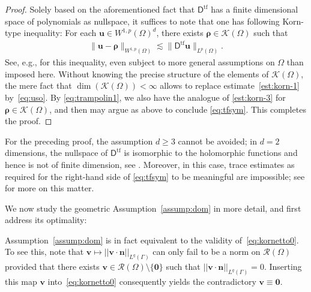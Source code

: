 \documentclass[reqno,a4paper]{amsart}
\def\norm#1{\left|\!\left| #1 \right|\!\right|}
\def\tens#1{\pmb{\mathsf{#1}}}
\def\vec#1{\boldsymbol{#1}}
\def\dim{\mathop{\mathrm{dim}}\nolimits} %
\def\b0{\vec{0}}
\def\bn{\vec{n}}
\def\bu{\vec{u}}
\def\bv{\vec{v}}
\def\brho{\vec{\rho}}
\def\BD{\tens{D}}
\begin{document}
	\begin{proof}
	Solely based on the aforementioned fact that $\BD^{\mathrm{tf}}$ has a finite dimensional space of polynomials as nullspace, it suffices to note that one has following Korn-type inequality: 
		For each $\bu\in W^{1,p}(\Omega)^{d}$, there exists $\brho\in\mathcal{K}(\Omega)$ such that 
		\begin{align}\label{eq:uso}
			\|\bu - \brho\|_{W^{1,p}(\Omega)}\lesssim \|\BD^{\mathrm{tf}}\bu\|_{L^{p}(\Omega)}. 
		\end{align}
  See, e.g., \cite{Resetnjak1,DieningGmeineder2024} for this inequality, even subject to more general assumptions on $\Omega$ than imposed here. Without knowing the precise structure of the elements of $\mathcal{K}(\Omega)$, the mere fact that $\dim(\mathcal{K}(\Omega))<\infty$ allows to replace estimate~\eqref{est:korn-1} by~\eqref{eq:uso}. By \eqref{eq:trampolin1}, we also have the analogue of \eqref{est:korn-3} for $\brho\in\mathcal{K}(\Omega)$,  and then may argue as above to conclude \eqref{eq:tfsym}. 
		This completes the proof. 
	\end{proof}
 For the preceding proof, the assumption $d\geq 3$ cannot be avoided; in $d=2$ dimensions, the nullspace of $\BD^{\mathrm{tf}}$ is isomorphic to the holomorphic functions and hence is not of finite dimension, see \cite{Resetnjak1}. Moreover, in this case, trace estimates as required for the right-hand side of \eqref{eq:tfsym} to be meaningful are impossible; see \cite{BDG.2020,DieningGmeineder2024} for more on this matter.   

 \medskip
	
	We now study the geometric Assumption~\ref{assump:dom} in more detail, and first address its optimality: 
	
	\begin{remark}  
		Assumption~\ref{assump:dom} is in fact equivalent to the validity of~\eqref{eq:kornetto0}. 
		To see this, note that $\bv\mapsto \norm{\bv\cdot\bn}_{L^{q}(\Gamma)}$ can only fail to be a norm on $\mathcal{R}(\Omega)$ provided that there exists $\bv\in\mathcal{R}(\Omega)\setminus\{\b0\}$ such that $\norm{\bv\cdot\bn}_{L^{q}(\Gamma)}=0$. 
		Inserting this map $\bv$ into~\eqref{eq:kornetto0} consequently yields the contradictory $\bv\equiv \b0$. 	
	\end{remark} 
	
\end{document}
